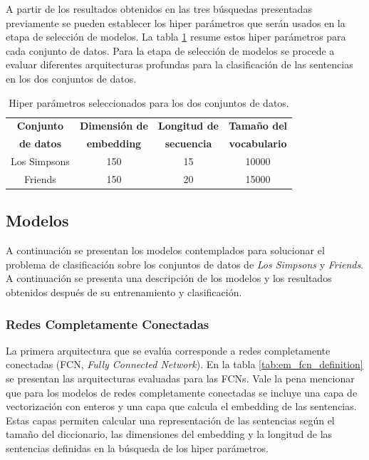 A partir de los resultados obtenidos en las tres búsquedas presentadas previamente se pueden establecer los hiper parámetros que serán usados en la etapa de selección de modelos. La tabla \ref{tab:em_hyper_params} resume estos hiper parámetros para cada conjunto de datos. Para la etapa de selección de modelos se procede a evaluar diferentes arquitecturas profundas para la clasificación de las sentencias en los dos conjuntos de datos.

\begin{table}[H]
    \centering
    \begin{tabular}{|c|c|c|c|}
        \hline
        \textbf{Conjunto } & \textbf{Dimensión de} & \textbf{Longitud de} & \textbf{Tamaño del}  \\
        \textbf{de datos} & \textbf{embedding} & \textbf{secuencia} & \textbf{vocabulario} \\ \hline
        Los Simpsons & 150 & 15 & 10000 \\ \hline
        Friends & 150 & 20 & 15000 \\ \hline
    \end{tabular}
    \caption{Hiper parámetros seleccionados para los dos conjuntos de datos.}
    \label{tab:em_hyper_params}
\end{table}

\subsection{Modelos}
A continuación se presentan los modelos contemplados para solucionar el problema de clasificación sobre los conjuntos de datos de \textit{Los Simpsons} y \textit{Friends}. A continuación se presenta una descripción de los modelos y los resultados obtenidos después de su entrenamiento y clasificación.

\subsubsection{Redes Completamente Conectadas}
La primera arquitectura que se evalúa corresponde a redes completamente conectadas (FCN, \textit{Fully Connected Network}). En la tabla \ref{tab:em_fcn_definition} se presentan las arquitecturas evaluadas para las FCNs. Vale la pena mencionar que para los modelos de redes completamente conectadas se incluye una capa de vectorización con enteros y una capa que calcula el embedding de las sentencias. Estas capas permiten calcular una representación de las sentencias según el tamaño del diccionario, las dimensiones del embedding y la longitud de las sentencias definidas en la búsqueda de los hiper parámetros.

